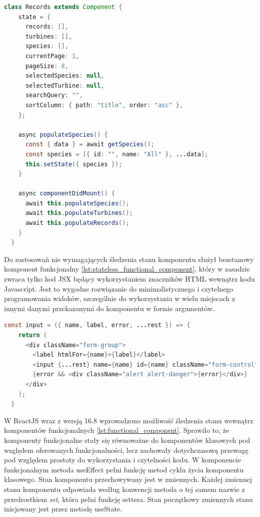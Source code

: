 \documentclass{sprz}
\begin{document}
\begin{lstlisting}[language=Java,caption={Przykład komponentu klasowego}, label={lst:class_component}]
  class Records extends Component {
    state = {
      records: [],
      turbines: [],
      species: [],
      currentPage: 1,
      pageSize: 8,
      selectedSpecies: null,
      selectedTurbine: null,
      searchQuery: "",
      sortColumn: { path: "title", order: "asc" },
    };
  
    async populateSpecies() {
      const { data } = await getSpecies();
      const species = [{ id: "", name: "All" }, ...data];
      this.setState({ species });
    }

    async componentDidMount() {
      await this.populateSpecies();
      await this.populateTurbines();
      await this.populateRecords();
    }
  }
\end{lstlisting}

Do zastosowań nie wymagających śledzenia stanu komponentu służył bezstanowy komponent funkcjonalny \ref{lst:stateless_functional_component}, który w zasadzie zwraca tylko kod JSX będący wykorzystaniem znaczników HTML wewnątrz kodu Javascript. Jest to wygodne rozwiązanie do minimalistycznego i czytelnego programowania widoków, szczególnie do wykorzystania w wielu miejscach z innymi danymi przekazanymi do komponentu w formie argumentów.

\begin{lstlisting}[language=Java,caption={Przykład bezstanowego komponentu funcjonalnego}, label={lst:stateless_functional_component}]
  const input = ({ name, label, error, ...rest }) => {
    return (
      <div className="form-group">
        <label htmlFor={name}>{label}</label>
        <input {...rest} name={name} id={name} className="form-control" />
        {error && <div className="alert alert-danger">{error}</div>}
      </div>
    );
  }
\end{lstlisting}

W ReactJS wraz z wersją 16.8 wprowadzono możliwość śledzenia stanu wewnątrz komponentów funkcjonalnych \ref{lst:functional_component}. Sprawiło to, że komponenty funkcjonalne stały się równoważne do komponentów klasowych pod względem oferowanych funkcjonalności, lecz zachowały dotychczasową przewagę pod względem prostoty do wykorzystania i czytelności kodu. W komponencie funkcjonalnym metoda useEffect pełni funkcję metod cyklu życia komponentu klasowego. Stan komponentu przechowywany jest w zmiennych. Każdej zmiennej stanu komponentu odpowiada według konwencji metoda o tej samem nazwie z przedrostkiem \textit{set}, która pełni funkcję settera. Stan początkowy zmiennych stanu inicjowany jest przez metodę useState.
\end{document}
